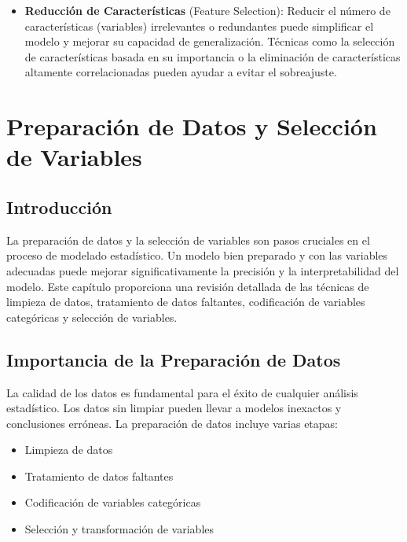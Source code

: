 \documentclass[a4paper]{report} %
\begin{document}
\begin{itemize}
\item \textbf{Reducción de Características} (Feature Selection): Reducir el número de características (variables) irrelevantes o redundantes puede simplificar el modelo y mejorar su capacidad de generalización. Técnicas como la selección de características basada en su importancia o la eliminación de características altamente correlacionadas pueden ayudar a evitar el sobreajuste.
\end{itemize}




\chapter{Preparaci\'on de Datos y Selecci\'on de Variables}


\section{Introducci\'on}

La preparaci\'on de datos y la selecci\'on de variables son pasos cruciales en el proceso de modelado estad\'istico. Un modelo bien preparado y con las variables adecuadas puede mejorar significativamente la precisi\'on y la interpretabilidad del modelo. Este cap\'itulo proporciona una revisi\'on detallada de las t\'ecnicas de limpieza de datos, tratamiento de datos faltantes, codificaci\'on de variables categ\'oricas y selecci\'on de variables.

\section{Importancia de la Preparaci\'on de Datos}

La calidad de los datos es fundamental para el \'exito de cualquier an\'alisis estad\'istico. Los datos sin limpiar pueden llevar a modelos inexactos y conclusiones err\'oneas. La preparaci\'on de datos incluye varias etapas:
\begin{itemize}
    \item Limpieza de datos
    \item Tratamiento de datos faltantes
    \item Codificaci\'on de variables categ\'oricas
    \item Selecci\'on y transformaci\'on de variables
\end{itemize}
\end{document}
